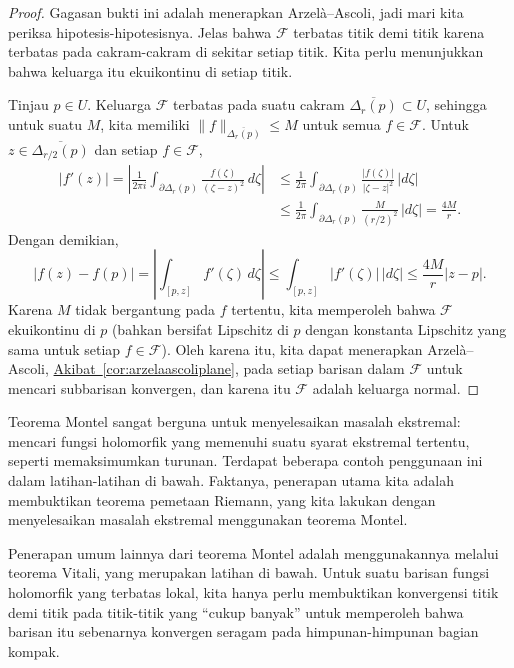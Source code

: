 \documentclass[12pt,openany]{book}
\newcommand{\sabs}[1]{\lvert {#1} \rvert}
\newcommand{\snorm}[1]{\lVert {#1} \rVert}
\newcommand{\abs}[1]{\left\lvert {#1} \right\rvert}
\newcommand{\sF}{{\mathscr{F}}}
\newcommand{\myquote}[1]{``#1''}
\theoremstyle{plain}
\theoremstyle{remark}
\theoremstyle{definition}
\theoremstyle{exercise}
\theoremstyle{example}
\newcommand{\corref}[1]{\hyperref[#1]{Akibat~\ref*{#1}}}
\begin{document}
\begin{proof}
Gagasan bukti ini adalah menerapkan Arzel\`a--Ascoli, jadi mari kita periksa
hipotesis-hipotesisnya.
Jelas bahwa $\sF$ terbatas titik demi titik karena terbatas pada cakram-cakram di sekitar
setiap titik.
Kita perlu menunjukkan bahwa keluarga itu ekuikontinu di setiap titik.

Tinjau $p \in U$.
Keluarga
$\sF$ terbatas pada suatu cakram $\overline{\Delta_r(p)} \subset U$,
sehingga untuk suatu $M$, kita memiliki
$\snorm{f}_{\overline{\Delta_r(p)}} \leq M$ untuk semua $f \in \sF$.
Untuk $z \in \overline{\Delta_{r/2}(p)}$ dan setiap $f \in \sF$,
\begin{equation*}
\begin{split}
\abs{f'(z)}
=
\abs{
\frac{1}{2\pi i}
\int_{\partial \Delta_r(p)}
\frac{f(\zeta)}{{(\zeta-z)}^2} \, d\zeta
}
& \leq
\frac{1}{2\pi}
\int_{\partial \Delta_r(p)}
\frac{\sabs{f(\zeta)}}{\sabs{\zeta-z}^2} \, \sabs{d\zeta}
\\
& \leq
\frac{1}{2\pi}
\int_{\partial \Delta_r(p)}
\frac{M}{{(r/2)}^2} \, \sabs{d\zeta}
=
\frac{4 M}{r}.
\end{split}
\end{equation*}
Dengan demikian,
\begin{equation*}
\abs{f(z)-f(p)}
=
\abs{
\int_{[p,z]} f'(\zeta) \, d\zeta
}
\leq
\int_{[p,z]} \abs{f'(\zeta)} \, \sabs{d\zeta}
\leq
\frac{4 M}{r} \sabs{z-p} .
\end{equation*}
Karena $M$ tidak bergantung pada $f$ tertentu, kita memperoleh bahwa $\sF$
ekuikontinu di $p$ (bahkan bersifat Lipschitz di $p$ dengan konstanta
Lipschitz yang sama untuk setiap $f \in \sF$).
Oleh karena itu, kita dapat menerapkan Arzel\`a--Ascoli, 
\corref{cor:arzelaascoliplane}, pada setiap barisan dalam $\sF$
untuk mencari subbarisan konvergen, dan karena itu $\sF$ adalah keluarga normal.
\end{proof}

Teorema Montel sangat berguna untuk menyelesaikan masalah ekstremal: 
mencari fungsi holomorfik yang memenuhi suatu syarat ekstremal tertentu,
seperti memaksimumkan turunan.  Terdapat beberapa contoh
penggunaan ini dalam latihan-latihan di bawah.  Faktanya, penerapan utama kita adalah
membuktikan teorema pemetaan Riemann, yang kita lakukan dengan menyelesaikan masalah
ekstremal menggunakan teorema Montel.

Penerapan umum lainnya dari teorema Montel adalah menggunakannya melalui teorema Vitali, yang merupakan
latihan di bawah.  Untuk suatu barisan fungsi holomorfik yang terbatas lokal,
kita hanya perlu membuktikan konvergensi titik demi titik pada titik-titik yang \myquote{cukup banyak}
untuk memperoleh bahwa barisan itu sebenarnya konvergen seragam pada himpunan-himpunan bagian kompak.
\end{document}
